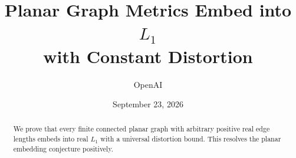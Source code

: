 \documentclass[11pt]{article}
\title{Planar Graph Metrics Embed into $L_1$\\with Constant Distortion}
\author{OpenAI}
\date{September 23, 2026}
\theoremstyle{definition}
\theoremstyle{remark}
\newcommand{\1}{\mathbf 1}
\begin{document}
\maketitle
\begin{abstract}
We prove that every finite connected planar graph with arbitrary positive
real edge lengths embeds into real $L_1$ with a universal distortion bound.
This resolves the planar embedding conjecture positively.
\end{abstract}
\tableofcontents













\end{document}
